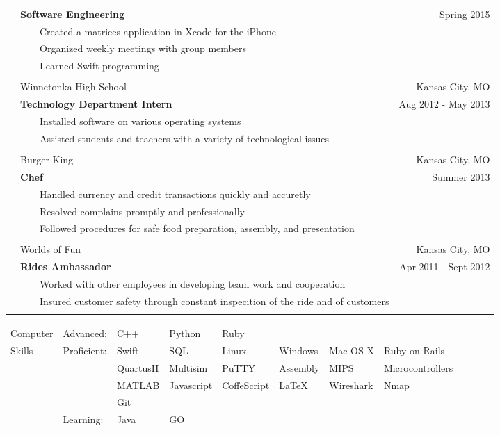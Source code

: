 \documentclass{article}
\newcommand{\tabitem}{~~\llap{\textbullet}~~}
\begin{document}
\begin{tabular}{p{1.5cm} p{12.9cm} r}
			& \textbf{Software Engineering} 									& Spring 2015 			\\
			& \tabitem Created a matrices application in Xcode for the iPhone 	& 						\\
			& \tabitem Organized weekly meetings with group members 			& 						\\
			& \tabitem Learned Swift programming 								& 						\\ \\

			& Winnetonka High School											& Kansas City, MO 		\\
			& \textbf{Technology Department Intern} 							& Aug 2012 - May 2013 	\\
			& \tabitem Installed software on various operating systems 			& 						\\
			& \tabitem Assisted students and teachers with a variety of technological issues	& 		\\ \\

			& Burger King														& Kansas City, MO 		\\
			& \textbf{Chef} 													& Summer 2013		 	\\
			& \tabitem Handled currency and credit transactions quickly and accuretly 			& 		\\
			& \tabitem Resolved complains promptly and professionally			& 						\\
			& \tabitem Followed procedures for safe food preparation, assembly, and presentation	& 	\\ \\

			& Worlds of Fun											& Kansas City, MO 					\\
			& \textbf{Rides Ambassador} 							& Apr 2011 - Sept 2012 				\\
			& \tabitem Worked with other employees in developing team work and cooperation 	& 			\\
			& \tabitem Insured customer safety through constant inspecition of the ride and of customers & \\ \\

\end{tabular}

\begin{tabular}{p{1.5cm} l l l l l l l}
Computer	& Advanced: 	& C++ 		& Python 	& Ruby		& 			& 			& 					\\
Skills		& Proficient:	& Swift 	& SQL 		& Linux 	& Windows 	& Mac OS X 	& Ruby on Rails  	\\
			&				& QuartusII & Multisim 	& PuTTY 	& Assembly 	& MIPS 		& Microcontrollers  \\
			& 				& MATLAB	& Javascript& CoffeScript& LaTeX	& Wireshark	& Nmap				\\
			& 				& Git		& 			& 			& 			& 			& 					\\

			& Learning:		& Java 		& GO 		& 			 & 			& 			& 					\\
\end{tabular}
\end{document}

